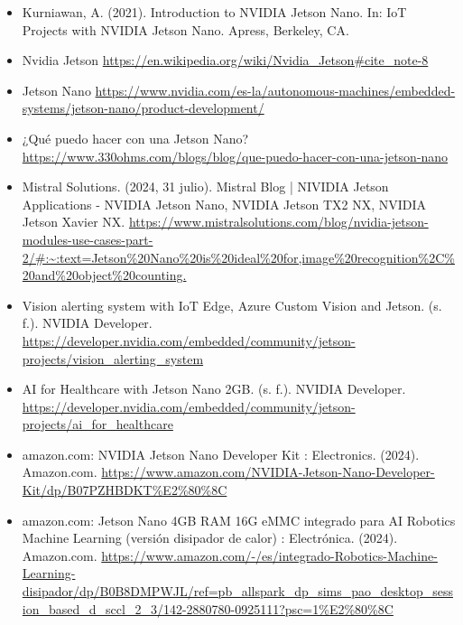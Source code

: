 \begin{itemize}
  \item Kurniawan, A. (2021). Introduction to NVIDIA Jetson Nano. In: IoT Projects with NVIDIA Jetson Nano. Apress, Berkeley, CA.
  \item Nvidia Jetson \url{https://en.wikipedia.org/wiki/Nvidia_Jetson#cite_note-8}
  \item Jetson Nano \url{https://www.nvidia.com/es-la/autonomous-machines/embedded-systems/jetson-nano/product-development/}
  \item ¿Qué puedo hacer con una Jetson Nano? \url{https://www.330ohms.com/blogs/blog/que-puedo-hacer-con-una-jetson-nano }
  \item Mistral Solutions. (2024, 31 julio). Mistral Blog | NIVIDIA Jetson Applications - NVIDIA Jetson Nano, NVIDIA Jetson TX2 NX, NVIDIA Jetson Xavier NX. \url{https://www.mistralsolutions.com/blog/nvidia-jetson-modules-use-cases-part-2/#:~:text=Jetson%20Nano%20is%20ideal%20for,image%20recognition%2C%20and%20object%20counting.}
  \item Vision alerting system with IoT Edge, Azure Custom Vision and Jetson. (s. f.). NVIDIA Developer. \url{https://developer.nvidia.com/embedded/community/jetson-projects/vision_alerting_system}
  \item AI for Healthcare with Jetson Nano 2GB. (s. f.). NVIDIA Developer. \url{https://developer.nvidia.com/embedded/community/jetson-projects/ai_for_healthcare}
  \item amazon.com: NVIDIA Jetson Nano Developer Kit : Electronics. (2024). Amazon.com. \url{https://www.amazon.com/NVIDIA-Jetson-Nano-Developer-Kit/dp/B07PZHBDKT%E2%80%8C}
  \item amazon.com: Jetson Nano 4GB RAM 16G eMMC integrado para AI Robotics Machine Learning (versión disipador de calor) : Electrónica. (2024). Amazon.com. \url{https://www.amazon.com/-/es/integrado-Robotics-Machine-Learning-disipador/dp/B0B8DMPWJL/ref=pb_allspark_dp_sims_pao_desktop_session_based_d_sccl_2_3/142-2880780-0925111?psc=1%E2%80%8C}
\end{itemize}
